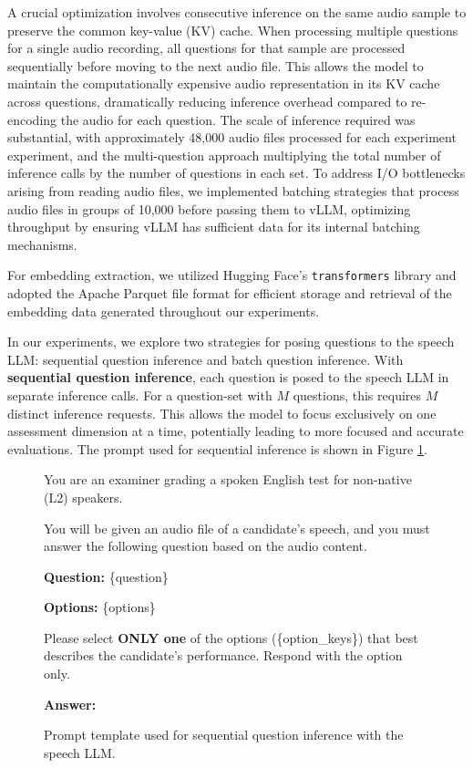 \documentclass{report}
\begin{document}
A crucial optimization involves consecutive inference on the same audio sample to preserve the common key-value (KV) cache. When processing multiple questions for a single audio recording, all questions for that sample are processed sequentially before moving to the next audio file. This allows the model to maintain the computationally expensive audio representation in its KV cache across questions, dramatically reducing inference overhead compared to re-encoding the audio for each question. The scale of inference required was substantial, with approximately 48,000 audio files processed for each experiment experiment, and the multi-question approach multiplying the total number of inference calls by the number of questions in each set. To address I/O bottlenecks arising from reading audio files, we implemented batching strategies that process audio files in groups of 10,000 before passing them to vLLM, optimizing throughput by ensuring vLLM has sufficient data for its internal batching mechanisms.

For embedding extraction, we utilized Hugging Face's \texttt{transformers} library \citep{wolf2020huggingfacestransformersstateoftheartnatural} and adopted the Apache Parquet file format \citep{apache_parquet} for efficient storage and retrieval of the embedding data generated throughout our experiments.

In our experiments, we explore two strategies for posing questions to the speech LLM: sequential question inference and batch question inference. With \textbf{sequential question inference}, each question is posed to the speech LLM in separate inference calls. For a question-set with $M$ questions, this requires $M$ distinct inference requests. This allows the model to focus exclusively on one assessment dimension at a time, potentially leading to more focused and accurate evaluations. The prompt used for sequential inference is shown in Figure \ref{fig:sequential_inference_prompt}.

\begin{figure}[h]
  \centering
  \begin{tcolorbox}[
    colback=white,
    colframe=black,
    boxrule=0.8pt,
    arc=4pt,
    width=0.95\linewidth,
    sharp corners=south,
    title=Sequential Inference Prompt Template
  ]
    \small
    You are an examiner grading a spoken English test for non-native (L2) speakers.

    You will be given an audio file of a candidate's speech, and you must answer the following question based on the audio content.

    \textbf{Question:} \{question\}

    \textbf{Options:} \{options\}

    Please select \textbf{ONLY one} of the options (\{option\_keys\}) that best describes the candidate's performance. Respond with the option only.

    \textbf{Answer:}
  \end{tcolorbox}
  \caption{Prompt template used for sequential question inference with the speech LLM.}
  \label{fig:sequential_inference_prompt}
\end{figure}
\end{document}
